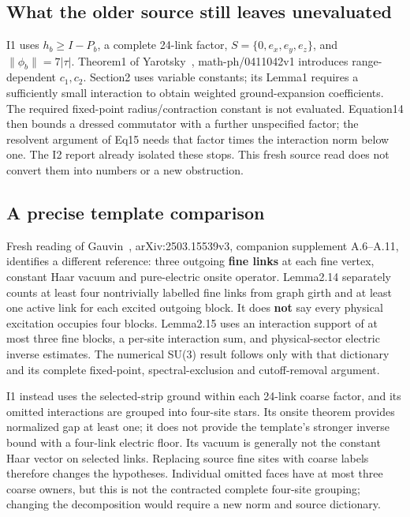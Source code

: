 \hypertarget{r29-am1-what-the-older-source-still-leaves-unevaluated}{%
\subsection{What the older source still leaves unevaluated}\label{r29:am1:r29-am1-what-the-older-source-still-leaves-unevaluated}}

I1 uses \(h_b\ge I-P_b\), a complete 24-link factor, \(S=\{0,e_x,e_y,e_z\}\), and \(\|\phi_b\|=7|\tau|\). Theorem1 of Yarotsky~\citep{yarotsky2004quasiparticles}, math-ph/0411042v1 introduces range-dependent \(c_1,c_2\). Section2 uses variable constants; its Lemma1 requires a sufficiently small interaction to obtain weighted ground-expansion coefficients. The required fixed-point radius/contraction constant is not evaluated. Equation14 then bounds a dressed commutator with a further unspecified factor; the resolvent argument of Eq15 needs that factor times the interaction norm below one. The I2 report already isolated these stops. This fresh source read does not convert them into numbers or a new obstruction.

\hypertarget{r29-am1-a-precise-template-comparison}{%
\subsection{A precise template comparison}\label{r29:am1:r29-am1-a-precise-template-comparison}}

Fresh reading of Gauvin~\citep{gauvin2026}, arXiv:2503.15539v3, companion supplement A.6--A.11, identifies a different reference: three outgoing \textbf{fine links} at each fine vertex, constant Haar vacuum and pure-electric onsite operator. Lemma2.14 separately counts at least four nontrivially labelled fine links from graph girth and at least one active link for each excited outgoing block. It does \textbf{not} say every physical excitation occupies four blocks. Lemma2.15 uses an interaction support of at most three fine blocks, a per-site interaction sum, and physical-sector electric inverse estimates. The numerical SU(3) result follows only with that dictionary and its complete fixed-point, spectral-exclusion and cutoff-removal argument.

I1 instead uses the selected-strip ground within each 24-link coarse factor, and its omitted interactions are grouped into four-site stars. Its onsite theorem provides normalized gap at least one; it does not provide the template's stronger inverse bound with a four-link electric floor. Its vacuum is generally not the constant Haar vector on selected links. Replacing source fine sites with coarse labels therefore changes the hypotheses. Individual omitted faces have at most three coarse owners, but this is not the contracted complete four-site grouping; changing the decomposition would require a new norm and source dictionary.

